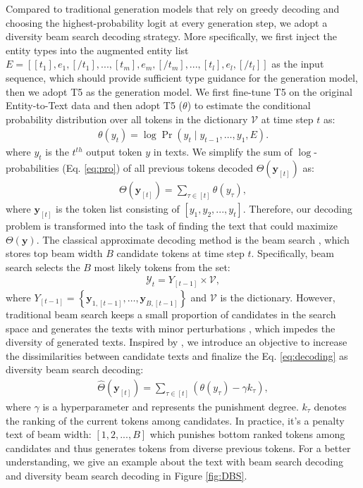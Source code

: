 Compared to traditional generation models that rely on greedy decoding \cite{chickering2002optimal} and choosing the highest-probability logit at every generation step, we adopt a diversity beam search decoding strategy. More specifically, we first inject the entity types into the augmented entity list $E = [[{t}_{1}], {e}_{1}, [/{t}_{1}],...,[{t}_{m}],{e}_{m},[/{t}_{m}], ...,[{t}_{l}], {e}_{l},[/{t}_{l}]]$
as the input sequence, which should provide sufficient type guidance for the generation model, then we adopt T5 \cite{raffel2020exploring} as the generation model. We first fine-tune T5 on the original Entity-to-Text data and then adopt T5 ($\theta$) to estimate the conditional probability distribution over all tokens in the dictionary $\mathcal{V}$ at time step $t$ as:
\begin{align}\label{eq:pro}
\theta\left(y_{t}\right)=\log \operatorname{Pr}\left(y_{t} \mid y_{t-1}, \ldots, y_{1}, E\right).
\end{align}
where ${y_{t}}$ is the ${{t}^{th}}$ output token ${y}$ in texts. We simplify the sum of $\log$-probabilities (Eq. \ref{eq:pro}) of all previous tokens decoded $\Theta(\mathbf{y}_{[t]})$ as:
\begin{align}\label{eq:decoding}
\Theta\left(\mathbf{y}_{[t]}\right)=\sum_{\tau \in[t]} \theta\left(y_{\tau}\right),
\end{align}
where $\mathbf{y}_{[t]}$ is the token list consisting of $[y_{1},y_{2},...,y_{t}]$. Therefore, our decoding problem is transformed into the task of finding the text that could maximize $\Theta(\mathbf{y})$. The classical approximate decoding method is the beam search \cite{wiseman2016sequence}, which stores top beam width $B$ candidate tokens at time step $t$. Specifically, beam search selects the $B$ most likely tokens from the set:
\begin{align}
\mathcal{Y}_{t}=Y_{[t-1]} \times \mathcal{V},
\end{align}
where $Y_{[t-1]}=\left\{\mathbf{y}_{1,[t-1]}, \ldots, \mathbf{y}_{B,[t-1]}\right\}$ and $\mathcal{V}$ is the dictionary. However, traditional beam search keeps a small proportion of candidates in the search space and generates the texts with minor perturbations \cite{huang2008forest}, which impedes the diversity of generated texts. Inspired by \citet{vijayakumar2016diverse}, we introduce an objective to increase the dissimilarities between candidate texts and finalize the Eq. \ref{eq:decoding} as diversity beam search decoding:
\begin{align}
\hat{\Theta}\left(\mathbf{y}_{[t]}\right)=\sum_{\tau \in[t]} (\theta\left(y_{\tau}\right) - \gamma k_{\tau}),
\end{align}
where $\gamma$ is a hyperparameter and represents the punishment degree. $k_{\tau}$ denotes the ranking of the current tokens among candidates. In practice, it's a penalty text of beam width: $[1,2,...,B]$ which punishes bottom ranked tokens among candidates and thus generates tokens from diverse previous tokens. For a better understanding, we give an example about the text with beam search decoding and diversity beam search decoding in Figure \ref{fig:DBS}. 

